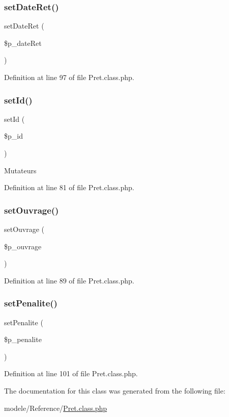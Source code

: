 \subsubsection{\texorpdfstring{set\+Date\+Ret()}{setDateRet()}}
{\footnotesize\ttfamily set\+Date\+Ret (\begin{DoxyParamCaption}\item[{}]{\$p\+\_\+date\+Ret }\end{DoxyParamCaption})}



Definition at line 97 of file Pret.\+class.\+php.

\mbox{\label{class_pret_ab2fff0fc655f96b6e5f4fcc294c49eee}} 
\subsubsection{\texorpdfstring{set\+Id()}{setId()}}
{\footnotesize\ttfamily set\+Id (\begin{DoxyParamCaption}\item[{}]{\$p\+\_\+id }\end{DoxyParamCaption})}

Mutateurs 

Definition at line 81 of file Pret.\+class.\+php.

\mbox{\label{class_pret_a721ed73a4d5b195a2cf9e0ec9001cad7}} 
\subsubsection{\texorpdfstring{set\+Ouvrage()}{setOuvrage()}}
{\footnotesize\ttfamily set\+Ouvrage (\begin{DoxyParamCaption}\item[{}]{\$p\+\_\+ouvrage }\end{DoxyParamCaption})}



Definition at line 89 of file Pret.\+class.\+php.

\mbox{\label{class_pret_a91be6085dead298d8a7f2d4358ec8607}} 
\subsubsection{\texorpdfstring{set\+Penalite()}{setPenalite()}}
{\footnotesize\ttfamily set\+Penalite (\begin{DoxyParamCaption}\item[{}]{\$p\+\_\+penalite }\end{DoxyParamCaption})}



Definition at line 101 of file Pret.\+class.\+php.



The documentation for this class was generated from the following file\+:\begin{DoxyCompactItemize}
\item 
modele/\+Reference/\hyperlink{_pret_8class_8php}{Pret.\+class.\+php}\end{DoxyCompactItemize}
